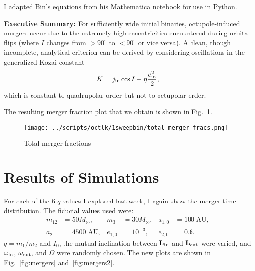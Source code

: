 \documentclass[11pt,
        usenames, %
        dvipsnames %
    ]{article}
\newcommand*{\bm}[1]{\boldsymbol{\mathbf{#1}}}
\begin{document}
\onehalfspacing

\pagestyle{fancy}
\rhead{}
\cfoot{\thepage/\pageref{LastPage}}

I adapted Bin's equations from his Mathematica notebook for use in Python.

\textbf{Executive Summary:} For sufficiently wide initial binaries,
octupole-induced mergers occur due to the extremely high eccentricities
encountered during orbital flips (where $I$ changes from $> 90^\circ$ to
$<90^\circ$ or vice versa). A clean, though incomplete, analytical criterion can
be derived by considering oscillations in the generalized Kozai constant
\begin{equation}
    K = j_{\rm in}\cos I - \eta\frac{e_{\rm in}^2}{2},
        \label{eq:K}
\end{equation}
which is constant to quadrupolar order but not to octupolar order.

The resulting merger fraction plot that we obtain is shown in
Fig.~\ref{fig:merges}.
\begin{figure}
    \centering
    \texttt{[image: ../scripts/octlk/1sweepbin/total\_merger\_fracs.png]}
    \caption{Total merger fractions}\label{fig:merges}
\end{figure}

\section{Results of Simulations}

For each of the $6$ $q$ values I explored last week, I again show the merger
time distribution. The fiducial values used were:
\begin{align*}
    m_{12} &= 50M_{\odot}, &
    m_3 &= 30 M_{\odot}, &
    a_{1,0} &= 100\;\mathrm{AU}, \\
    a_2 &= 4500\;\mathrm{AU},&
    e_{1, 0} &= 10^{-3}, &
    e_{2, 0} &= 0.6.
\end{align*}
$q = m_1 / m_2$ and $I_0$, the mutual inclination between $\bm{L}_{\rm in}$ and
$\bm{L}_{\rm out}$ were varied, and $\omega_{\rm in}$, $\omega_{\rm out}$, and
$\Omega$ were randomly chosen. The new plots are shown in
Fig.~\ref{fig:mergers} and~\ref{fig:mergers2}.
\end{document}
